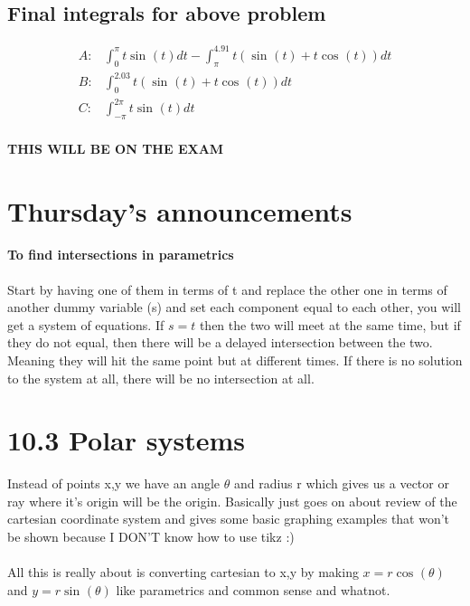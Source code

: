 \subsection{Final integrals for above problem}%
\label{sub:Final integrals for above problem}
\begin{align*}
	A:& \int_{ 0 }^{ \pi  } t\sin^{  } \left( t \right) dt-\int_{ \pi  }^{ 4.91 } t\left( \sin^{  } \left( t \right) +t\cos^{  } \left( t \right)  \right) dt\\
	B:& \int_{ 0 }^{ 2.03 } t\left( \sin^{  } \left( t \right) +t\cos^{  } \left( t \right)  \right) dt \\
	C:& \int_{ -\pi  }^{ 2\pi  } t\sin^{  } \left( t \right) dt
\end{align*}
\paragraph{THIS WILL BE ON THE EXAM}

\section{Thursday's announcements}%
\label{sec:Thursday's announcements}
\paragraph{To find intersections in parametrics}
Start by having one of them in terms of t and replace the other one in terms of another dummy variable (s) and set each component equal to each other, you will get a system of equations. If $ s=t $ then the two will meet at the same time, but if they do not equal, then there will be a delayed intersection between the two. Meaning they will hit the same point but at different times. If there is no solution to the system at all, there will be no intersection at all.

\section{ 10.3 Polar systems}%
\label{sec:Polar systems}
Instead of points x,y we have an angle $ \theta $ and radius r which gives us a vector or ray where it's origin will be the origin. Basically just goes on about review of the cartesian coordinate system and gives some basic graphing examples that won't be shown because I DON'T know how to use tikz :)\\\\
All this is really about is converting cartesian to x,y by making $ x=r\cos^{  } \left( \theta \right)  $ and $ y=r\sin^{  } \left( \theta \right)  $ like parametrics and common sense and whatnot.

